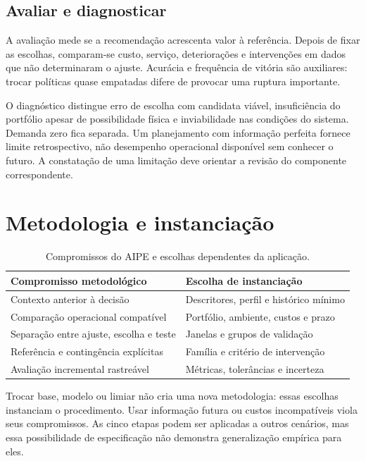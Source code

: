 \subsection{Avaliar e diagnosticar}
A avaliação mede se a recomendação acrescenta valor à referência. Depois de fixar as escolhas, comparam-se custo, serviço, deteriorações e intervenções em dados que não determinaram o ajuste. Acurácia e frequência de vitória são auxiliares: trocar políticas quase empatadas difere de provocar uma ruptura importante.

O diagnóstico distingue erro de escolha com candidata viável, insuficiência do portfólio apesar de possibilidade física e inviabilidade nas condições do sistema. Demanda zero fica separada. Um planejamento com informação perfeita fornece limite retrospectivo, não desempenho operacional disponível sem conhecer o futuro. A constatação de uma limitação deve orientar a revisão do componente correspondente.

\section{Metodologia e instanciação}
\begin{table}[htbp]\centering\small
\caption{Compromissos do AIPE e escolhas dependentes da aplicação.}\label{tab:metodo_instancia}
\begin{tabular}{@{}p{5.6cm}p{7cm}@{}}\toprule
Compromisso metodológico & Escolha de instanciação\\\midrule
Contexto anterior à decisão & Descritores, perfil e histórico mínimo\\
Comparação operacional compatível & Portfólio, ambiente, custos e prazo\\
Separação entre ajuste, escolha e teste & Janelas e grupos de validação\\
Referência e contingência explícitas & Família e critério de intervenção\\
Avaliação incremental rastreável & Métricas, tolerâncias e incerteza\\\bottomrule
\end{tabular}\end{table}

Trocar base, modelo ou limiar não cria uma nova metodologia: essas escolhas instanciam o procedimento. Usar informação futura ou custos incompatíveis viola seus compromissos. As cinco etapas podem ser aplicadas a outros cenários, mas essa possibilidade de especificação não demonstra generalização empírica para eles.

